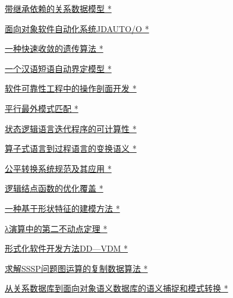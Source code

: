 \documentclass[a4paper]{article}
\begin{document}
\href{http://www.jos.org.cn/ch/reader/download_pdf.aspx?file_no=1996s143&year_id=1996&quarter_id=zk&falg=1}{带继承依赖的关系数据模型 *}

\href{http://www.jos.org.cn/ch/reader/download_pdf.aspx?file_no=1996s144&year_id=1996&quarter_id=zk&falg=1}{面向对象软件自动化系统JDAUTO/O *}

\href{http://www.jos.org.cn/ch/reader/download_pdf.aspx?file_no=1996s145&year_id=1996&quarter_id=zk&falg=1}{一种快速收敛的遗传算法 *}

\href{http://www.jos.org.cn/ch/reader/download_pdf.aspx?file_no=1996s146&year_id=1996&quarter_id=zk&falg=1}{一个汉语短语自动界定模型 *}

\href{http://www.jos.org.cn/ch/reader/download_pdf.aspx?file_no=1996s147&year_id=1996&quarter_id=zk&falg=1}{软件可靠性工程中的操作剖面开发 *}

\href{http://www.jos.org.cn/ch/reader/download_pdf.aspx?file_no=1996s148&year_id=1996&quarter_id=zk&falg=1}{平行最外模式匹配 *}

\href{http://www.jos.org.cn/ch/reader/download_pdf.aspx?file_no=1996s149&year_id=1996&quarter_id=zk&falg=1}{状态逻辑语言迭代程序的可计算性 *}

\href{http://www.jos.org.cn/ch/reader/download_pdf.aspx?file_no=1996s150&year_id=1996&quarter_id=zk&falg=1}{算子式语言到过程语言的变换语义 *}

\href{http://www.jos.org.cn/ch/reader/download_pdf.aspx?file_no=1996s151&year_id=1996&quarter_id=zk&falg=1}{公平转换系统规范及其应用 *}

\href{http://www.jos.org.cn/ch/reader/download_pdf.aspx?file_no=1996s152&year_id=1996&quarter_id=zk&falg=1}{逻辑结点函数的优化覆盖 *}

\href{http://www.jos.org.cn/ch/reader/download_pdf.aspx?file_no=1996s153&year_id=1996&quarter_id=zk&falg=1}{一种基于形状特征的建模方法 *}

\href{http://www.jos.org.cn/ch/reader/download_pdf.aspx?file_no=1996s154&year_id=1996&quarter_id=zk&falg=1}{λ演算中的第二不动点定理 *}

\href{http://www.jos.org.cn/ch/reader/download_pdf.aspx?file_no=1996s155&year_id=1996&quarter_id=zk&falg=1}{形式化软件开发方法DD—VDM *}

\href{http://www.jos.org.cn/ch/reader/download_pdf.aspx?file_no=1996s156&year_id=1996&quarter_id=zk&falg=1}{求解SSSP问题图运算的复制数据算法 *}

\href{http://www.jos.org.cn/ch/reader/download_pdf.aspx?file_no=1996s157&year_id=1996&quarter_id=zk&falg=1}{从关系数据库到面向对象语义数据库的语义捕捉和模式转换 *}
\end{document}

